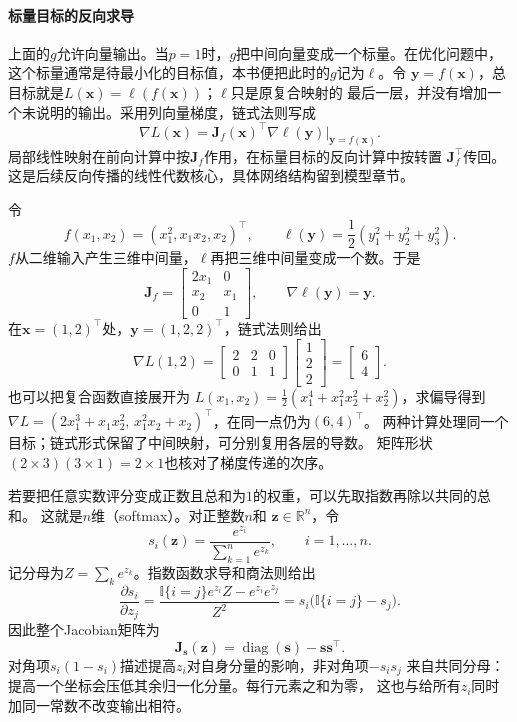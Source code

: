 \paragraph{标量目标的反向求导}

上面的$g$允许向量输出。当$p=1$时，$g$把中间向量变成一个标量。在优化问题中，
这个标量通常是待最小化的目标值，本书便把此时的$g$记为$\ell$。令
$\bm y=f(\bm x)$，总目标就是$L(\bm x)=\ell(f(\bm x))$；$\ell$只是原复合映射的
最后一层，并没有增加一个未说明的输出。采用列向量梯度，链式法则写成
\[
  \nabla L(\bm x)
  =\bm J_f(\bm x)^\top\nabla\ell(\bm y)\big|_{\bm y=f(\bm x)}.
\]
局部线性映射在前向计算中按$\bm J_f$作用，在标量目标的反向计算中按转置
$\bm J_f^\top$传回。这是后续反向传播的线性代数核心，具体网络结构留到模型章节。

\begin{example}[从中间向量求回复合目标的梯度]
\label{ex:analysis-chain-rule-calculation}
令
\[
  f(x_1,x_2)=(x_1^2,x_1x_2,x_2)^\top,
  \qquad \ell(\bm y)=\frac12(y_1^2+y_2^2+y_3^2).
\]
$f$从二维输入产生三维中间量，$\ell$再把三维中间量变成一个数。于是
\[
  \bm J_f=\begin{bmatrix}2x_1&0\\x_2&x_1\\0&1\end{bmatrix},
  \qquad \nabla\ell(\bm y)=\bm y.
\]
在$\bm x=(1,2)^\top$处，$\bm y=(1,2,2)^\top$，链式法则给出
\[
  \nabla L(1,2)
  =\begin{bmatrix}2&2&0\\0&1&1\end{bmatrix}
    \begin{bmatrix}1\\2\\2\end{bmatrix}
  =\begin{bmatrix}6\\4\end{bmatrix}.
\]
也可以把复合函数直接展开为
$L(x_1,x_2)=\tfrac12(x_1^4+x_1^2x_2^2+x_2^2)$，求偏导得到
$\nabla L=(2x_1^3+x_1x_2^2,\,x_1^2x_2+x_2)^\top$，在同一点仍为$(6,4)^\top$。
两种计算处理同一个目标；链式形式保留了中间映射，可分别复用各层的导数。
矩阵形状$(2\times3)(3\times1)=2\times1$也核对了梯度传递的次序。
\end{example}

若要把任意实数评分变成正数且总和为$1$的权重，可以先取指数再除以共同的总和。
这就是$n$维（softmax）。对正整数$n$和
$\bm{z}\in\mathbb{R}^n$，令
\[
  s_i(\bm{z})
  =
  \frac{e^{z_i}}{\sum_{k=1}^n e^{z_k}},
  \qquad i=1,\ldots,n.
\]
记分母为$Z=\sum_k e^{z_k}$。指数函数求导和商法则给出
\[
  \frac{\partial s_i}{\partial z_j}
  =
  \frac{\mathbb{I}\{i=j\}e^{z_i}Z-e^{z_i}e^{z_j}}{Z^2}
  =
  s_i\bigl(\mathbb{I}\{i=j\}-s_j\bigr).
\]
因此整个Jacobian矩阵为
\begin{equation}
  \bm{J}_{\bm{s}}(\bm{z})
  =
  \operatorname{diag}(\bm{s})-\bm{s}\bm{s}^{\top}.
\label{eq:analysis-softmax-jacobian}
\end{equation}
对角项$s_i(1-s_i)$描述提高$z_i$对自身分量的影响，非对角项$-s_is_j$
来自共同分母：提高一个坐标会压低其余归一化分量。每行元素之和为零，
这也与给所有$z_i$同时加同一常数不改变输出相符。

